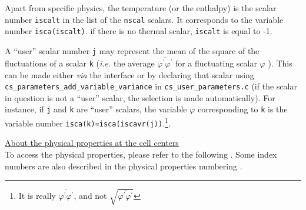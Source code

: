 {{{{\begin{list}{-}{}
\item Apart from specific physics, the temperature (or the enthalpy) is the
      scalar number \texttt{iscalt} in the list of the
      \texttt{nscal} scalars. It corresponds to the variable number
      \texttt{isca(iscalt)}. if there is no thermal scalar,
      \texttt{iscalt} is equal to -1.
\item A ``user'' scalar number \texttt{j} may represent the mean of the
      square of the fluctuations of a scalar \texttt{k} ({\em i.e.} the average
      $\overline{\varphi^\prime\varphi^\prime}$ for a fluctuating scalar
      $\varphi$ ). This can be made either {\em via} the
      interface or by declaring that scalar using
      \texttt{cs\_parameters\_add\_variable\_variance} in
      \texttt{cs\_user\_parameters.c} (if the scalar in question is not a ``user''
      scalar, the selection is made automatically). For instance, if \texttt{j}
      and \texttt{k} are ``user'' scalars, the variable $\varphi$ corresponding
      to \texttt{k} is the variable number
      \texttt{isca(k)=isca(iscavr(j))}.\footnote{It is really
      $\overline{\varphi^\prime\varphi^\prime}$, and not
      $\displaystyle\sqrt{\overline{\varphi^\prime\varphi^\prime}}$}.
\end{list}

\bigskip

\underline{About the physical properties at the cell centers}\\
To access the physical properties, please refer to the following
. Some
index numbers are also described in the physical properties
numbering .

}}}}
